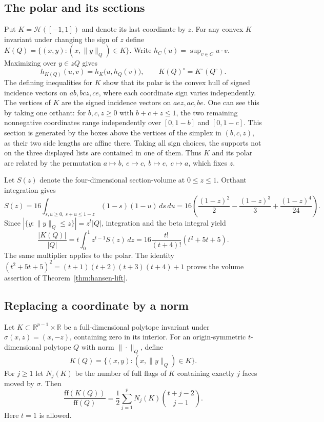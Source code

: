 \documentclass[11pt,a4paper]{article}
\numberwithin{equation}{section}
\begin{document}
\subsection{The polar and its sections}
Put $K=\mathcal H([-1,1])$ and denote its last coordinate by $z$. For any convex $K$ invariant under changing the sign of $z$ define $K(Q)=\{(x,y):(x,\|y\|_Q)\in K\}$. Write $h_C(u)=\sup_{v\in C}u\cdot v$. Maximizing over $y\in zQ$ gives
\[
 h_{K(Q)}(u,v)=h_K\big(u,h_Q(v)\big),\qquad
 K(Q)^\circ=K^\circ(Q^\circ).
\]
The defining inequalities for $K$ show that its polar is the convex hull of signed incidence vectors on $ab,bcz,ce$, where each coordinate sign varies independently. The vertices of $K$ are the signed incidence vectors on $aez,ac,be$. One can see this by taking one orthant: for $b,c,z\ge0$ with $b+c+z\le1$, the two remaining nonnegative coordinates range independently over $[0,1-b]$ and $[0,1-c]$. This section is generated by the boxes above the vertices of the simplex in $(b,c,z)$, as their two side lengths are affine there. Taking all sign choices, the supports not on the three displayed lists are contained in one of them. Thus $K$ and its polar are related by the permutation $a\mapsto b,\ e\mapsto c,\ b\mapsto e,\ c\mapsto a$, which fixes $z$.

Let $S(z)$ denote the four-dimensional section-volume at $0\le z\le1$. Orthant integration gives
\[
 S(z)=16\int_{s,u\ge0,\ s+u\le1-z}(1-s)(1-u)\,ds\,du
 =16\left(\frac{(1-z)^2}{2}-\frac{(1-z)^3}{3}+\frac{(1-z)^4}{24}\right).
\]
Since $|\{y:\|y\|_Q\le z\}|=z^t|Q|$, integration and the beta integral yield
\[
 \frac{|K(Q)|}{|Q|}=t\int_0^1z^{t-1}S(z)\,dz
 =16\frac{t!}{(t+4)!}(t^2+5t+5).
\]
The same multiplier applies to the polar. The identity $(t^2+5t+5)^2=(t+1)(t+2)(t+3)(t+4)+1$ proves the volume assertion of Theorem~\ref{thm:hansen-lift}.

\subsection{Replacing a coordinate by a norm}
Let $K\subset\mathbb R^{p-1}\times\mathbb R$ be a full-dimensional polytope invariant under $\sigma(x,z)=(x,-z)$, containing zero in its interior. For an origin-symmetric $t$-dimensional polytope $Q$ with norm $\|\cdot\|_Q$, define
\[
 K(Q)=\{(x,y):(x,\|y\|_Q)\in K\}.
\]
For $j\ge1$ let $N_j(K)$ be the number of full flags of $K$ containing exactly $j$ faces moved by $\sigma$. Then
\begin{equation}
 \frac{\mathrm{ff}(K(Q))}{\mathrm{ff}(Q)}
 =\frac12\sum_{j=1}^{p} N_j(K)\binom{t+j-2}{j-1}.
 \label{eq:hansen-flag-sub}
\end{equation}
Here $t=1$ is allowed.
\end{document}
